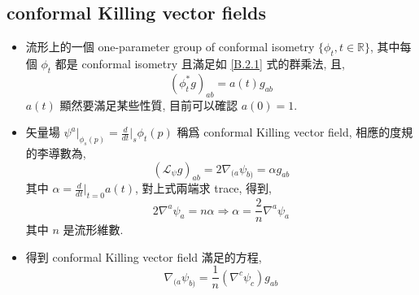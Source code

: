 \subsection{conformal Killing vector fields}
\begin{itemize}
	\item 流形上的一個 one-parameter group of conformal isometry $\{ \phi_t , t \in \mathbb{R} \}$, 其中每個 $\phi_t$ 都是 conformal isometry 且滿足如 \eqref{B.2.1} 式的群乘法, 且,
	\begin{equation}
		(\phi^*_t g)_{a b} = a(t) g_{a b}
	\end{equation}
	$a(t)$ 顯然要滿足某些性質, 目前可以確認 $a(0) = 1$.
	
	\item 矢量場 $\psi^a\big|_{\phi_s(p)} = \frac{d}{dt}\big|_s \phi_t(p)$ 稱爲 conformal Killing vector field, 相應的度規的李導數為,
	\begin{equation}
		(\mathcal{L}_\psi g)_{a b} = 2 \nabla_{(a} \psi_{b)} = \alpha g_{a b}
	\end{equation}
	其中 $\alpha = \frac{d}{dt}\big|_{t = 0} a(t)$, 對上式兩端求 trace, 得到,
	\begin{equation}
		2 \nabla^a \psi_a = n \alpha \Longrightarrow \alpha = \frac{2}{n} \nabla^a \psi_a
	\end{equation}
	其中 $n$ 是流形維數.
	
	\item 得到 conformal Killing vector field 滿足的方程,
	\begin{equation}
		\nabla_{(a} \psi_{b)} = \frac{1}{n} (\nabla^c \psi_c) g_{a b}
	\end{equation}
\end{itemize}

